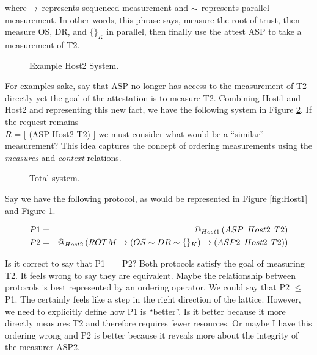 \documentclass[12pt, letterpaper]{article}
\begin{document}
where $\to$ represents sequenced measurement and $\stackrel{}{\sim}$ represents parallel measurement. In other words, this phrase says, measure the root of trust, then measure OS, DR, and $\{ \}_{K}$ in parallel, then finally use the attest ASP to take a measurement of T2. 


\begin{figure}[]
  \centering 
  \caption{Example Host2 System.}
  \label{fig:Host2}
\end{figure}

For examples sake, say that ASP no longer has access to the measurement of T2 directly yet the goal of the attestation is to measure T2. Combining Host1 and Host2 and representing this new fact, we have the following system in Figure \ref{fig:System1}. If the request remains \\  $R$ = [ (ASP Host2 T2) ] we must consider what would be a ``similar'' measurement? This idea captures the concept of ordering measurements using the \emph{measures} and \emph{context} relations. 

\begin{figure}[htbp]
  \centering 
  \caption{Total system.}
  \label{fig:System1}
\end{figure}


Say we have the following protocol, as would be represented in Figure \ref{fig:Host1} and Figure \ref{fig:Host2}.

\begin{eqnarray*}
  P1 &=& \mathop{@_{Host1}}{(}ASP\:\: Host2\:\: T2) \\
  P2 &=& \mathop{@_{Host2}}{(ROTM \to ( OS \stackrel{}{\sim} DR \stackrel{}{\sim} \{ \}_{K} ) \to (ASP2\:\: Host2\:\: T2))}
\end{eqnarray*}

Is it correct to say that P1 $=$ P2? Both protocols satisfy the goal of measuring T2. It feels wrong to say they are equivalent. Maybe the relationship between protocols is best represented by an ordering operator. We could say that P2 $\leq$ P1. The certainly feels like a step in the right direction of the lattice. However, we need to explicitly define how P1 is ``better''. Is it better because it more directly measures T2 and therefore requires fewer resources. Or maybe I have this ordering wrong and P2 is better because it reveals more about the integrity of the measurer ASP2. 
\end{document}
